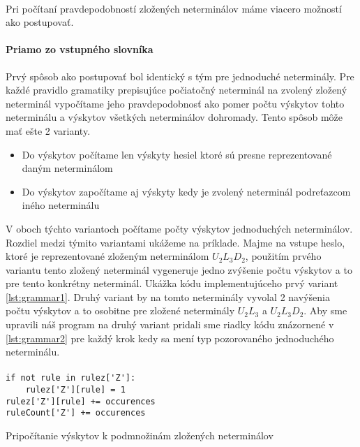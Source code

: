 \paragraph{}
Pri počítaní pravdepodobností zložených neterminálov máme viacero možností ako postupovať.
\paragraph{Priamo zo vstupného slovníka}
Prvý spôsob ako postupovať bol identický s tým pre jednoduché neterminály. Pre každé pravidlo gramatiky prepisujúce počiatočný neterminál na zvolený zložený neterminál vypočítame jeho pravdepodobnosť ako pomer počtu výskytov tohto neterminálu a výskytov všetkých neterminálov dohromady. Tento spôsob môže mať ešte 2 varianty.
\begin{itemize}
	\item Do výskytov počítame len výskyty hesiel ktoré sú presne reprezentované daným neterminálom
	\item Do výskytov započítame aj výskyty kedy je zvolený neterminál podreťazcom iného neterminálu
\end{itemize}
V oboch týchto variantoch počítame počty výskytov jednoduchých neterminálov. Rozdiel medzi týmito variantami ukážeme na príklade. Majme na vstupe heslo, ktoré je reprezentované zloženým neterminálom \(U_2L_3D_2\), použitím prvého variantu tento zložený neterminál vygeneruje jedno zvýšenie počtu výskytov a to pre tento konkrétny neterminál. Ukážka kódu implementujúceho prvý variant \ref{lst:grammar1}. Druhý variant by na tomto neterminály vyvolal 2 navýšenia počtu výskytov a to osobitne pre zložené neterminály \(U_2L_3\) a \(U_2L_3D_2\). Aby sme upravili náš program na druhý variant pridali sme riadky kódu znázornené v \ref{lst:grammar2} pre každý krok kedy sa mení typ pozorovaného jednoduchého neterminálu.

\paragraph{}
\begin{listing}
\begin{verbatim}
if not rule in rulez['Z']:
	rulez['Z'][rule] = 1
rulez['Z'][rule] += occurences
ruleCount['Z'] += occurences
\end{verbatim}
\caption{Pripočítanie výskytov k podmnožinám zložených neterminálov}
\label{lst:grammar2}
\end{listing}

